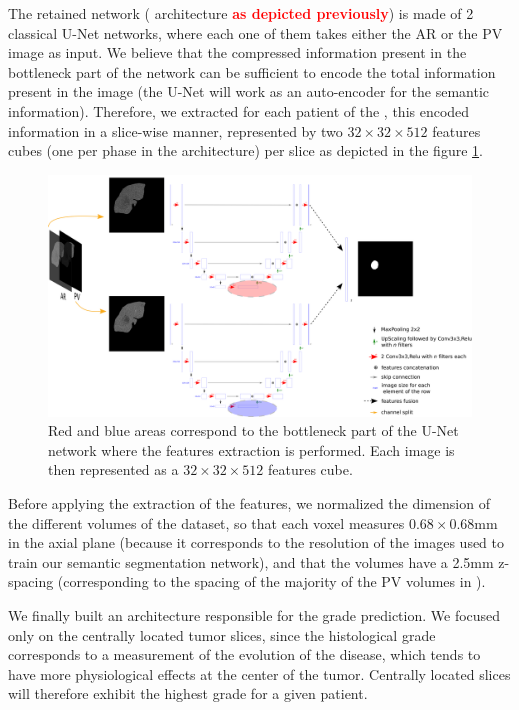 The retained network ( architecture \textcolor{red}{\textbf{as depicted previously}}) is made of 2 classical U-Net networks, where each
one of them takes either the AR or the PV image as input. We believe
that the compressed information present in the bottleneck part of the
network can be sufficient to encode the total information present in the
image (the U-Net will work as an auto-encoder for the semantic information). Therefore, we extracted for each patient of the , this
encoded information in a slice-wise manner, represented by two $ 32\times32\times512 $
features cubes (one per phase in the  architecture) per slice
as depicted in the figure \ref{fig:MPF_Features_Selection}.


\begin{figure}[th!]
\centering
\includegraphics[width=0.95\linewidth]{images/MPF_Features_Selection}
\caption{Red and blue areas correspond to the bottleneck part of the U-Net
network where the features extraction is performed. Each image is then
represented as a $ 32\times32\times512 $ features cube.}
\label{fig:MPF_Features_Selection}
\end{figure}


Before applying the extraction of the features, we normalized
the dimension of the different volumes of the dataset, so that each
voxel measures $ 0.68\times0.68 $mm in the axial plane (because it corresponds to
the resolution of the images used to train our semantic segmentation
network), and that the volumes have a 2.5mm z-spacing (corresponding to the
spacing of the majority of the PV volumes in ).

We finally built an architecture responsible for the grade prediction.
We focused only on the centrally located tumor slices, since the
histological grade corresponds to a measurement of the evolution of the
disease, which tends to have more physiological effects at the center of
the tumor. Centrally located slices will therefore exhibit the highest
grade for a given patient.

